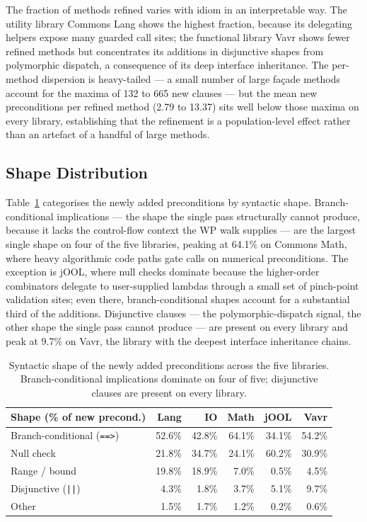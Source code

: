 The fraction of methods refined varies with idiom in an interpretable way. The
utility library Commons Lang shows the highest fraction, because its delegating
helpers expose many guarded call sites; the functional library Vavr shows fewer
refined methods but concentrates its additions in disjunctive shapes from
polymorphic dispatch, a consequence of its deep interface inheritance. The
per-method dispersion is heavy-tailed --- a small number of large fa\c{c}ade
methods account for the maxima of 132 to 665 new clauses --- but the mean new
preconditions per refined method (2.79 to 13.37) sits well below those maxima on
every library, establishing that the refinement is a population-level effect
rather than an artefact of a handful of large methods.

\subsection{Shape Distribution}

Table~\ref{tab:comp-shapes} categorises the newly added preconditions by
syntactic shape. Branch-conditional implications --- the shape the single pass
structurally cannot produce, because it lacks the control-flow context the WP
walk supplies --- are the largest single shape on four of the five libraries,
peaking at 64.1\% on Commons Math, where heavy algorithmic code paths gate calls
on numerical preconditions. The exception is jOOL, where null checks dominate
because the higher-order combinators delegate to user-supplied lambdas through a
small set of pinch-point validation sites; even there, branch-conditional shapes
account for a substantial third of the additions. Disjunctive clauses --- the
polymorphic-dispatch signal, the other shape the single pass cannot produce ---
are present on every library and peak at 9.7\% on Vavr, the library with the
deepest interface inheritance chains.

\begin{table}[ht]
\centering
\small
\caption{Syntactic shape of the newly added preconditions across the five
libraries. Branch-conditional implications dominate on four of five; disjunctive
clauses are present on every library.}
\label{tab:comp-shapes}
\begin{tabular}{lrrrrr}
\toprule
\textbf{Shape (\% of new precond.)} & \textbf{Lang} & \textbf{IO} & \textbf{Math} & \textbf{jOOL} & \textbf{Vavr} \\
\midrule
Branch-conditional (\texttt{==>})  & 52.6\% & 42.8\% & 64.1\% & 34.1\% & 54.2\% \\
Null check                         & 21.8\% & 34.7\% & 24.1\% & 60.2\% & 30.9\% \\
Range / bound                      & 19.8\% & 18.9\% & 7.0\%  & 0.5\%  & 4.5\%  \\
Disjunctive (\texttt{||})          & 4.3\%  & 1.8\%  & 3.7\%  & 5.1\%  & 9.7\%  \\
Other                              & 1.5\%  & 1.7\%  & 1.2\%  & 0.2\%  & 0.6\%  \\
\bottomrule
\end{tabular}
\end{table}


